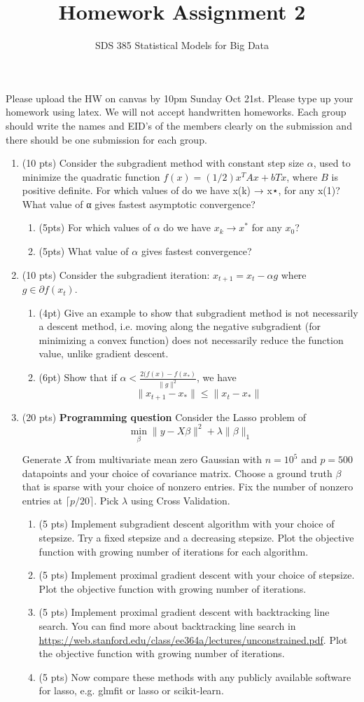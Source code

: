 \documentclass[11pt]{article}
\newcommand{\bi}{\begin{enumerate}}
\newcommand{\ib}{\end{enumerate}}
\newcommand{\p}{\item}
\begin{document}
\title{{\bf Homework Assignment 2}}
\author{SDS 385 Statistical Models for Big Data}

\date{}

\maketitle{}
Please upload the HW on canvas by 10pm Sunday Oct 21st. Please type up your homework using latex. We will not accept handwritten homeworks. Each group should write the names and EID's of the members clearly on the submission and there should be one submission for each group. 
\begin{enumerate}%
\item (10 pts)  Consider the subgradient method with constant step size $\alpha$, used to minimize the quadratic function $f (x) = (1/2)x^T A x + bT x$, where $B$ is positive definite. For which values of  do we have x(k) → x⋆, for any x(1)? What value of α gives fastest asymptotic convergence?
\bi
\p (5pts) For which values of $\alpha$ do we have $x_k \rightarrow x^*$ for any $x_0$?
\p (5pts) What value of $\alpha$ gives fastest convergence?
\ib
\p (10 pts) Consider the subgradient iteration: $x_{t+1}=x_t-\alpha g$ where $g\in\partial f(x_t)$.
\bi
\p (4pt) Give an example to show that subgradient method is not necessarily a descent method, i.e. moving along the negative subgradient (for minimizing a convex function) does not necessarily reduce the function value, unlike gradient descent.
\p (6pt) Show that if $\alpha< \frac{2(f(x)-f(x_*)}{\|g\|^2}$, we have  $$\|x_{t+1}-x_*\|\leq \|x_t-x_*\|$$
\ib


\item (20 pts) \textbf{Programming question} Consider the Lasso problem of
$$\min_\beta \|y-X\beta\|^2+\lambda\|\beta\|_1$$

Generate $X$ from multivariate mean zero Gaussian with $n=10^5$ and $p=500$ datapoints and your choice of covariance matrix. Choose a ground truth $\beta$ that is sparse with your choice of nonzero entries. Fix the number of nonzero entries at $\lceil p/20 \rceil $.
Pick $\lambda$ using Cross Validation.
\bi
\p (5 pts) Implement subgradient descent algorithm with your choice of stepsize. Try a fixed stepsize and a decreasing stepsize. Plot the objective function with growing number of iterations for each algorithm.
\p (5 pts) Implement proximal gradient descent with your choice of stepsize. Plot the objective function with growing number of iterations.
\p (5 pts) Implement proximal gradient descent with backtracking line search. You can find more about backtracking line search in \url{https://web.stanford.edu/class/ee364a/lectures/unconstrained.pdf}. Plot the objective function with growing number of iterations.
\p (5 pts) Now compare these methods with any publicly available software for lasso, e.g. glmfit or lasso or scikit-learn.
\ib
\end{enumerate}
\end{document}
